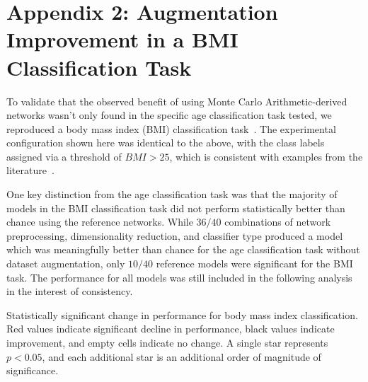 \documentclass[10pt]{SelfArx} %
\newcommand{\new}[1]{\color{blue}#1\color{black}\xspace}
\begin{document}
\clearpage
\onecolumn
\new{
\section*{Appendix 2: Augmentation Improvement in a BMI Classification Task}

To validate that the observed benefit of using Monte Carlo Arithmetic-derived networks wasn't only found in the
specific age classification task tested, we reproduced a body mass index (BMI) classification task~\cite{Park2015-uj}.
The experimental configuration shown here was identical to the above, with the class labels assigned via a threshold
of $BMI > 25$, which is consistent with examples from the literature~\cite{Park2015-uj}.

One key distinction from the age classification task was that the majority of models in the BMI classification task
did not perform statistically better than chance using the reference networks. While $36/40$ combinations of network
preprocessing, dimensionality reduction, and classifier type produced a model which was meaningfully better than chance
for the age classification task without dataset augmentation, only $10/40$ reference models were significant for the
BMI task. The performance for all models was still included in the following analysis in the interest of consistency.

\begin{table}[h!]
\centering
\caption{Statistically significant change in performance for body mass index classification. Red values indicate
significant decline in performance, black values indicate improvement, and empty cells indicate no change. A single
star represents $p < 0.05$, and each additional star is an additional order of magnitude of significance.}
\label{tab1:perf_app}
\small

\end{table}

}
\end{document}
